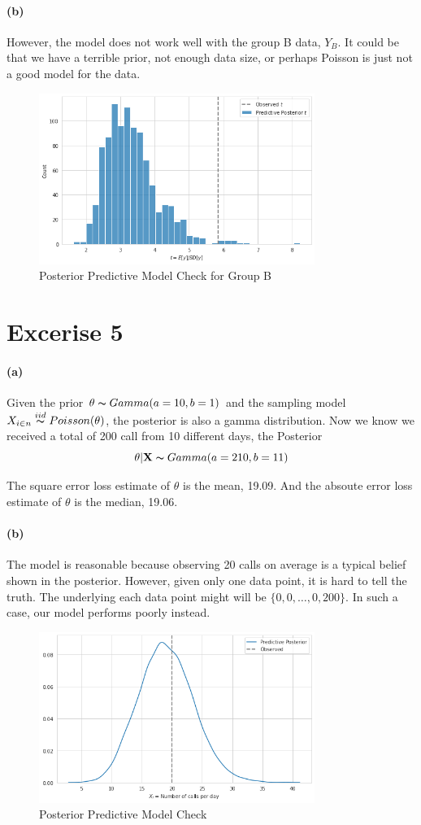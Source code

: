 \documentclass[11pt, letterpaper]{article}
\begin{document}
\paragraph{(b)}
However, the model does not work well with the group B data, $Y_B$. It could be that we have a terrible prior,
not enough data size, or perhaps Poisson is just not a good model for the data.

\begin{figure}[!h]
  \centering
  \includegraphics[width=0.8\textwidth]{4.3.b.png}
  \captionsetup{justification=centering}
  \caption{Posterior Predictive Model Check for Group B}
\end{figure}
\newpage


\section{Excerise 5}
\paragraph{(a)}
Given the prior $\theta \thicksim Gamma(a=10, b=1)$ and the sampling model
$X_{i \in n} \overset{iid}{\thicksim} Poisson(\theta)$, the posterior is also a gamma distribution.
Now we know we received a total of 200 call from 10 different days, the Posterior
\[ \theta|\mathbf{X} \thicksim Gamma(a=210, b=11) \]

The square error loss estimate of $\theta$ is the mean, 19.09. And the absoute error loss estimate of $\theta$
is the median, 19.06.

\paragraph{(b)}
The model is reasonable because observing 20 calls on average is a typical belief shown in the posterior.
However, given only one data point, it is hard to tell the truth. The underlying each data point might will be
$\{0, 0, \dots, 0, 200\}$. In such a case, our model performs poorly instead.

\begin{figure}[!h]
  \centering
  \includegraphics[width=0.8\textwidth]{5.b.png}
  \captionsetup{justification=centering}
  \caption{Posterior Predictive Model Check}
\end{figure}
\newpage
\end{document}
